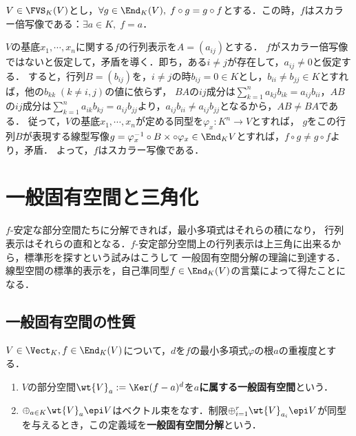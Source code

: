 \documentclass[uplatex, dvipdfmx]{jsreport}
\begin{document}
\begin{lemma}[スカラー倍写像の特徴付け]
    $V\in\FVS_K(V)$とし，$\forall g\in\End_K(V),\;f\circ g=g\circ f$とする．この時，$f$はスカラー倍写像である：$\exists a\in K,\; f=a$．
\end{lemma}
\begin{Proof}
    $V$の基底$x_1,\cdots,x_n$に関する$f$の行列表示を$A=(a_{ij})$とする．
    $f$がスカラー倍写像ではないと仮定して，矛盾を導く．即ち，ある$i\ne j$が存在して，$a_{ij}\ne 0$と仮定する．
    すると，行列$B=(b_{ij})$を，$i\ne j$の時$b_{ij}=0\in K$とし，$b_{ii}\ne b_{jj}\in K$とすれば，他の$b_{kk}\;(k\ne i,j)$の値に依らず，
    $BA$の$ij$成分は$\sum^n_{k=1}a_{kj}b_{ik}=a_{ij}b_{ii}$，$AB$の$ij$成分は$\sum^n_{k=1}a_{ik}b_{kj}=a_{ij}b_{jj}$より，$a_{ij}b_{ii}\ne a_{ij}b_{jj}$となるから，$AB\ne BA$である．
    従って，$V$の基底$x_1,\cdots,x_n$が定める同型を$\varphi_x:K^n\to V$とすれば，
    $g$をこの行列$B$が表現する線型写像$g=\varphi_x^{-1}\circ B\times\circ\varphi_x\in\End_K{V}$とすれば，$f\circ g\ne g\circ f$より，矛盾．
    よって，$f$はスカラー写像である．
\end{Proof}

\section{一般固有空間と三角化}

\begin{tcolorbox}[colframe=ForestGreen, colback=ForestGreen!10!white, breakable]
    $f$-安定な部分空間たちに分解できれば，最小多項式はそれらの積になり，
    行列表示はそれらの直和となる．$f$-安定部分空間上の行列表示は上三角に出来るから，標準形を探すという試みはこうして
    一般固有空間分解の理論に到達する．
    線型空間の標準的表示を，自己準同型$f\in\End_K(V)$の言葉によって得たことになる．
\end{tcolorbox}

\subsection{一般固有空間の性質}

\begin{definition}
    $V\in\Vect_K,f\in\End_K(V)$について，$d$を$f$の最小多項式$\varphi$の根$a$の重複度とする．
    \begin{enumerate}
        \item $V$の部分空間$\wt{V}_a:=\Ker(f-a)^d$を\textbf{$a$に属する一般固有空間}という．
        \item $\oplus_{a\in K}\wt{V}_a\epi V$はベクトル束をなす．制限$\oplus_{i=1}^r\wt{V}_{a_i}\epi V$が同型を与えるとき，この定義域を\textbf{一般固有空間分解}という．
    \end{enumerate}
\end{definition}
\end{document}
